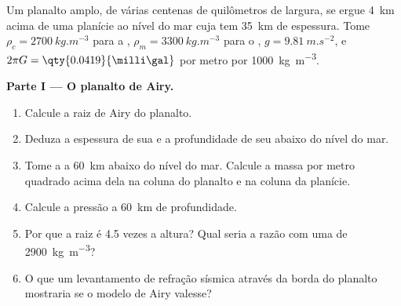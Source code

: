 \begin{problem}
\label{pb:b1:isostasy-gravity:1}
Um planalto amplo, de várias centenas de quilômetros de largura, se ergue \qty{4}{km} acima de uma planície ao nível do mar cuja  tem \qty{35}{km} de espessura. Tome
$\rho_c = \qty{2700}{kg.m^{-3}}$ para a , $\rho_m = \qty{3300}{kg.m^{-3}}$
para o , $g = \qty{9.81}{m.s^{-2}}$, e
$2\pi G = \qty{0.0419}{\milli\gal}$ por metro por \qty{1000}{kg.m^{-3}}.

\medskip
\noindent\textbf{Parte I --- O planalto de Airy.}
\begin{enumerate}
  \item Calcule a raiz de Airy do planalto.
  \item Deduza a espessura de sua  e a profundidade de seu  abaixo do
        nível do mar.
  \item Tome a  a \qty{60}{km} abaixo do nível do mar. Calcule a
        massa por metro quadrado acima dela na coluna do planalto e na coluna da planície.
  \item Calcule a pressão a \qty{60}{km} de profundidade.
  \item Por que a raiz é 4.5 vezes a altura? Qual seria a razão com uma
         de \qty{2900}{kg.m^{-3}}?
  \item O que um levantamento de refração sísmica através da borda do planalto
        mostraria se o modelo de Airy valesse?
\end{enumerate}


\end{problem}
